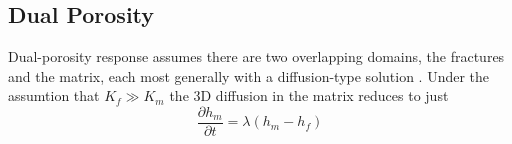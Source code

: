 \documentclass{article}
\begin{document}
\subsection{Dual Porosity}
Dual-porosity response assumes there are two overlapping domains, the
fractures and the matrix, each most generally with a diffusion-type
solution \cite{dougherty1984flow}.  Under the assumtion that $K_f \gg
K_m$ the 3D diffusion in the matrix reduces to just
\begin{equation}
  \label{eq:2}
  \frac{\partial h_m}{\partial t} = \lambda \left( h_m - h_f\right)
\end{equation}



\end{document}
